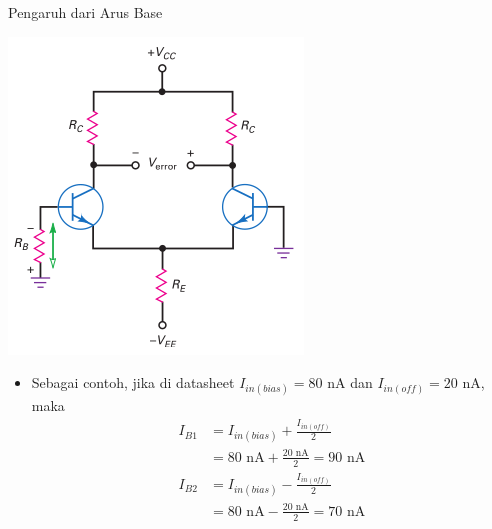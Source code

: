 \documentclass[aspectratio=169]{beamer}
\begin{document}
\begin{frame}{Pengaruh dari Arus Base}
	\begin{multicols}{2}
		\begin{center}
			\includegraphics[height=0.7\textheight]{gambar/01.base_resistor_produces_unwanted_input_voltage}
		\end{center}
	\columnbreak
		\begin{itemize}
			\item Sebagai contoh, jika di datasheet $ I_{in(bias)} = 80 \text{ nA} $ dan $ I_{in(off)} = 20 \text{ nA}$, maka
			\begin{align*}
				I_{B1} &= I_{in(bias)} + \frac{I_{in(off)}}{2} \\
				&= 80 \text{ nA} + \frac{20 \text{ nA}}{2} = 90 \text{ nA} \\
				I_{B2} &= I_{in(bias)} - \frac{I_{in(off)}}{2} \\
				&= 80 \text{ nA} - \frac{20 \text{ nA}}{2} = 70 \text{ nA}
			\end{align*}
		\end{itemize}
	\end{multicols}
\end{frame}
\end{document}
